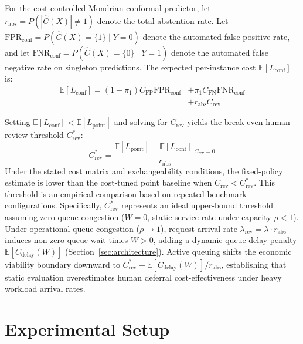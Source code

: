 \documentclass{ieeetj}
\begin{document}
For the cost-controlled Mondrian conformal predictor, let $r_{\mathrm{abs}} = P(|\hat{C}(X)| \neq 1)$ denote the total abstention rate. Let $\mathrm{FPR}_{\mathrm{conf}} = P(\hat{C}(X)=\{1\} \mid Y=0)$ denote the automated false positive rate, and let $\mathrm{FNR}_{\mathrm{conf}} = P(\hat{C}(X)=\{0\} \mid Y=1)$ denote the automated false negative rate on singleton predictions. The expected per-instance cost $\mathbb{E}[L_{\mathrm{conf}}]$ is:
\begin{equation}
\begin{split}
\mathbb{E}[L_{\mathrm{conf}}] = (1-\pi_1) C_{\mathrm{FP}} \mathrm{FPR}_{\mathrm{conf}} &+ \pi_1 C_{\mathrm{FN}} \mathrm{FNR}_{\mathrm{conf}} \\
&+ r_{\mathrm{abs}} C_{\mathrm{rev}}
\end{split}
\end{equation}

Setting $\mathbb{E}[L_{\mathrm{conf}}] < \mathbb{E}[L_{\text{point}}]$ and solving for $C_{\mathrm{rev}}$ yields the break-even human review threshold $C_{\mathrm{rev}}^*$:
\begin{equation}
C_{\mathrm{rev}}^* = \frac{\mathbb{E}[L_{\mathrm{point}}] - \mathbb{E}[L_{\mathrm{conf}}]\big|_{C_{\mathrm{rev}}=0}}{r_{\mathrm{abs}}}
\end{equation}
Under the stated cost matrix and exchangeability conditions, the fixed-policy estimate is lower than the cost-tuned point baseline when $C_{\mathrm{rev}} < C_{\mathrm{rev}}^*$. This threshold is an empirical comparison based on repeated benchmark configurations. Specifically, $C_{\mathrm{rev}}^*$ represents an ideal upper-bound threshold assuming zero queue congestion ($W=0$, static service rate under capacity $\rho < 1$). Under operational queue congestion ($\rho \to 1$), request arrival rate $\lambda_{\mathrm{rev}} = \lambda \cdot r_{\mathrm{abs}}$ induces non-zero queue wait times $W > 0$, adding a dynamic queue delay penalty $\mathbb{E}[C_{\mathrm{delay}}(W)]$ (Section~\ref{sec:architecture}). Active queuing shifts the economic viability boundary downward to $C_{\mathrm{rev}}^* - \mathbb{E}[C_{\mathrm{delay}}(W)]/r_{\mathrm{abs}}$, establishing that static evaluation overestimates human deferral cost-effectiveness under heavy workload arrival rates.

\section{Experimental Setup}
\label{sec:exp_setup}
\end{document}
